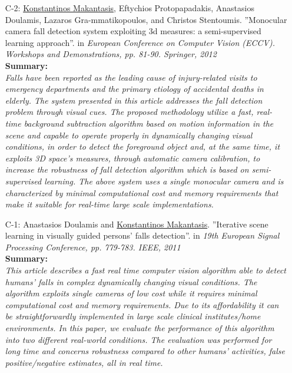\documentclass[a4paper,10pt]{article}
\begin{document}
\begin{itemize}
	\item [C-2:]\underline{Konstantinos Makantasis}, Eftychios Protopapadakis, Anastasios Doulamis, Lazaros Gra-mmatikopoulos, and Christos Stentoumis. ''Monocular camera fall detection system exploiting 3d measures: a semi-supervised learning approach''. in \textit{European Conference on Computer Vision (ECCV). Workshops and Demonstrations, pp. 81-90. Springer, 2012}\\
	\textbf{Summary:}\\
	\textit{Falls have been reported as the leading cause of injury-related visits to emergency departments and the primary etiology of accidental deaths in elderly. The system presented in this article addresses the fall detection problem through visual cues. The proposed methodology utilize a fast, real-time background subtraction algorithm based on motion information in the scene and capable to operate properly in dynamically changing visual conditions, in order to detect the foreground object and, at the same time, it exploits 3D space’s measures, through automatic camera calibration, to increase the robustness of fall detection algorithm which is based on semi-supervised learning. The above system uses a single monocular camera and is characterized by minimal computational cost and memory requirements that make it suitable for real-time large scale implementations.}
	
	\item [C-1:]Anastasios Doulamis and \underline{Konstantinos Makantasis}. ''Iterative scene learning in visually guided persons' falls detection''. in \textit{19th European Signal Processing Conference, pp. 779-783. IEEE, 2011}\\
	\textbf{Summary:}\\
	\textit{This article describes a fast real time computer vision algorithm able to detect humans' falls in complex dynamically changing visual conditions. The algorithm exploits single cameras of low cost while it requires minimal computational cost and memory requirements. Due to its affordability it can be straightforwardly implemented in large scale clinical institutes/home environments. In this paper, we evaluate the performance of this algorithm into two different real-world conditions. The evaluation was performed for long time and concerns robustness compared to other humans' activities, false positive/negative estimates, all in real time.}
\end{itemize}
\end{document}
